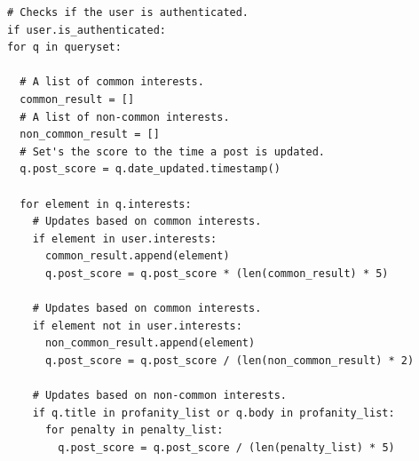\lstset{language=Python}
\lstset{frame=lines}
\begin{lstlisting}
# Checks if the user is authenticated.
if user.is_authenticated:
for q in queryset:

  # A list of common interests.
  common_result = []
  # A list of non-common interests.
  non_common_result = []
  # Set's the score to the time a post is updated.
  q.post_score = q.date_updated.timestamp()

  for element in q.interests:
    # Updates based on common interests.
    if element in user.interests:
      common_result.append(element)
      q.post_score = q.post_score * (len(common_result) * 5)

    # Updates based on common interests.
    if element not in user.interests:
      non_common_result.append(element)
      q.post_score = q.post_score / (len(non_common_result) * 2)

    # Updates based on non-common interests.
    if q.title in profanity_list or q.body in profanity_list:
      for penalty in penalty_list:
        q.post_score = q.post_score / (len(penalty_list) * 5)
\end{lstlisting}
